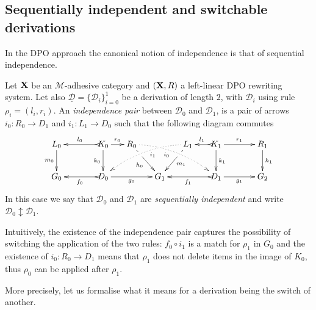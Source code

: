 \documentclass[a4paper,UKenglish,cleveref,pdftex,thm-restate,numberwithinsect,anonymous]{lipics}
\def\R{\mathsf{R}}
\def\X{\textbf {\textup{X}}}
\def\G{\textbf {\textup{G}}}
\newcommand{\dder}[1]{\mathscr{#1}}
\newcommand{\der}[1]{\underline{\dder{#1}}}
\newcommand{\seqind}{\ensuremath{\updownarrow}}
\begin{document}
\subsection{Sequentially independent and switchable derivations }\label{subsec:switch}



In the DPO approach the canonical notion of independence is that of sequential independence.

\begin{definition}
  \label{de:sequential-independence}
  Let $\X$ be an $\mathcal{M}$-adhesive category 
  and $(\X, \R)$ a left-linear DPO rewriting system. 
  Let also
  $\der{D}=\{\dder{D}_i\}_{i=0}^1$ be a derivation of length $2$, with
  $\dder{D}_i$ using rule $\rho_i = (l_i,r_i)$.  An \emph{independence
    pair} between $\dder{D}_0$ and $\dder{D}_1$, is a pair of arrows
  $i_0\colon R_0\to D_1$ and $i_1\colon L_1\to D_0$ such that the
  following diagram commutes
  \[\xymatrix@C=15pt{L_0 \ar[d]_{m_0}&& K_0
      \ar[d]_{k_0}\ar@{>->}[ll]_{l_0} \ar[r]^{r_0} & R_0
      \ar@{.>}@/^.35cm/[drrr]|(.3)\hole_(.4){i_0}
      \ar[dr]|(.3)\hole_{h_0} && L_1 \ar@{.>}@/_.35cm/[dlll]^(.4){i_1}
      \ar[dl]|(.3)\hole^{m_1}& K_1 \ar[d]^{k_1}\ar@{>->}[l]_{l_1}
      \ar[rr]^{r_1} && R_1 \ar[d]^{h_1}\\G_0 && \ar@{>->}[ll]^{f_0}
      D_0 \ar[rr]_{g_0}&& G_1 && \ar@{>->}[ll]^{f_1} D_1
      \ar[rr]_{g_1}&& G_2}\] In this case we say that $\dder{D}_0$ and
  $\dder{D}_1$ are
  \emph{sequentially independent} and write $\dder{D}_0 \seqind \dder{D}_1$.
\end{definition}

Intuitively, the existence of the independence pair
captures the possibility of switching the application of the two rules:
$f_0 \circ i_1$ is a match for $\rho_1$ in $G_0$ and the
existence of $i_0 : R_0 \to D_1$ means that $\rho_1$ does not delete
items in the image of $K_0$, thus $\rho_0$ can be applied after
$\rho_1$.

More precisely, let us formalise what it means for a derivation being the switch of another.

\end{document}
